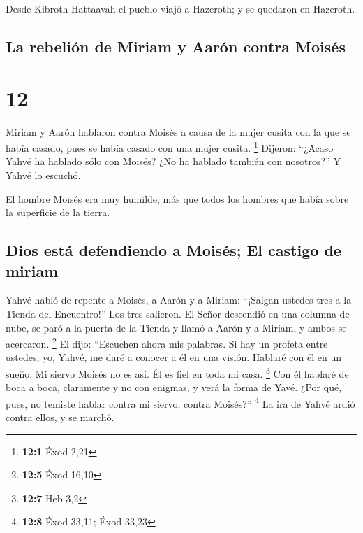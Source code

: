  Desde Kibroth Hattaavah el pueblo viajó a Hazeroth; y se
quedaron en Hazeroth.

\hypertarget{la-rebeliuxf3n-de-miriam-y-aaruxf3n-contra-moisuxe9s}{%
\subsection{La rebelión de Miriam y Aarón contra
Moisés}\label{la-rebeliuxf3n-de-miriam-y-aaruxf3n-contra-moisuxe9s}}

\hypertarget{section-11}{%
\section{12}\label{section-11}}

 Miriam y Aarón hablaron contra Moisés a causa de la mujer
cusita con la que se había casado, pues se había casado con una mujer
cusita. \footnote{\textbf{12:1} Éxod 2,21}  Dijeron:
``¿Acaso Yahvé ha hablado sólo con Moisés? ¿No ha hablado también con
nosotros?'' Y Yahvé lo escuchó.

 El hombre Moisés era muy humilde, más que todos los
hombres que había sobre la superficie de la tierra.

\hypertarget{dios-estuxe1-defendiendo-a-moisuxe9s-el-castigo-de-miriam}{%
\subsection{Dios está defendiendo a Moisés; El castigo de
miriam}\label{dios-estuxe1-defendiendo-a-moisuxe9s-el-castigo-de-miriam}}

 Yahvé habló de repente a Moisés, a Aarón y a Miriam:
``¡Salgan ustedes tres a la Tienda del Encuentro!'' Los tres salieron.
 El Señor descendió en una columna de nube, se paró a la
puerta de la Tienda y llamó a Aarón y a Miriam, y ambos se acercaron.
\footnote{\textbf{12:5} Éxod 16,10}  El dijo: ``Escuchen
ahora mis palabras. Si hay un profeta entre ustedes, yo, Yahvé, me daré
a conocer a él en una visión. Hablaré con él en un sueño. 
Mi siervo Moisés no es así. Él es fiel en toda mi casa. \footnote{\textbf{12:7}
  Heb 3,2}  Con él hablaré de boca a boca, claramente y no
con enigmas, y verá la forma de Yavé. ¿Por qué, pues, no temiste hablar
contra mi siervo, contra Moisés?'' \footnote{\textbf{12:8} Éxod 33,11;
  Éxod 33,23}  La ira de Yahvé ardió contra ellos, y se
marchó.

